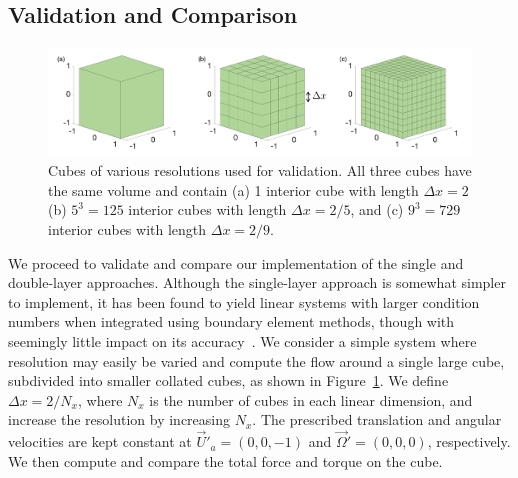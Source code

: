 	\subsection{Validation and Comparison}
	\label{sec:bie_validataion}
\begin{figure}[ht]
	\begin{center}
		\includegraphics[scale=0.45]{./figures/fig_cube_all_dx}
	\end{center}
	\caption{Cubes of various resolutions used for validation. All three cubes have the same volume and contain (a) 1 interior cube with length $\Delta x = 2$ (b) $5^3=125$  interior cubes with length $\Delta x = 2/5$, and (c) $9^3 = 729$  interior cubes with length $\Delta x = 2/9$.}
	\label{fig_test_cubes}
\end{figure}
We proceed to validate and compare our implementation of the single and double-layer approaches. Although the single-layer approach is somewhat simpler to implement, it has been found to yield linear systems with larger condition numbers when integrated using boundary element methods, though with seemingly little impact on its accuracy~\cite{youngren_stokes_1975,ingber_comparison_1999}.
We consider a simple system where resolution may easily be varied and compute the flow around a single large cube, subdivided into smaller collated cubes, as shown in Figure~\ref{fig_test_cubes}.
We define $\Delta x  = 2 / N_x$, where $N_x$ is the number of cubes in each linear dimension, and increase the resolution by increasing $N_x$.
The prescribed translation and angular velocities are kept constant at $\vec{U}'_a = (0,0,-1)$ and $\vec{\Omega}'= (0,0,0)$, respectively. We then compute and compare the total force and torque on the cube. 
\par
